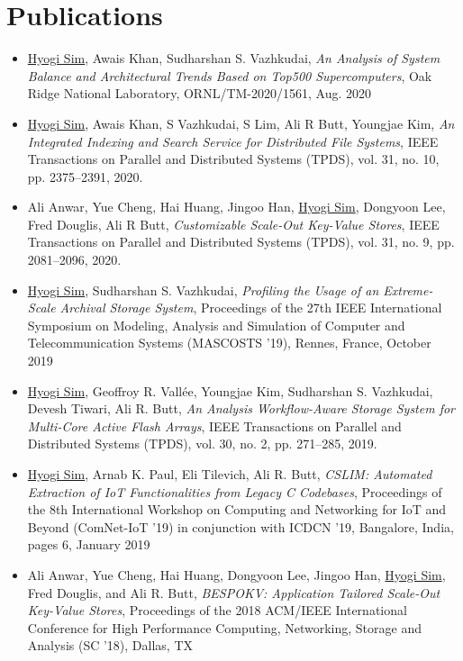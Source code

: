 \section{Publications}
\begin{itemize}
\item \underline{Hyogi Sim}, Awais Khan, Sudharshan S. Vazhkudai,
  {\it An Analysis of System Balance and Architectural Trends Based on Top500 Supercomputers},
  Oak Ridge National Laboratory, ORNL/TM-2020/1561, Aug. 2020
\item \underline{Hyogi Sim}, Awais Khan, S Vazhkudai, S Lim, Ali R Butt, Youngjae Kim,
  {\it An Integrated Indexing and Search Service for Distributed File Systems},
  IEEE Transactions on Parallel and Distributed Systems (TPDS), 
  vol. 31, no. 10, pp. 2375–2391, 2020.
\item Ali Anwar, Yue Cheng, Hai Huang, Jingoo Han, \underline{Hyogi Sim},
      Dongyoon Lee, Fred Douglis, Ali R Butt,
  {\it Customizable Scale-Out Key-Value Stores},
  IEEE Transactions on Parallel and Distributed Systems (TPDS),
  vol. 31, no. 9, pp. 2081–2096, 2020.
\item \underline{Hyogi Sim}, Sudharshan S. Vazhkudai,
  {\it Profiling the Usage of an Extreme-Scale Archival Storage System},
  Proceedings of the 27th IEEE International Symposium on Modeling, Analysis and Simulation of Computer and Telecommunication Systems
  (MASCOSTS '19), Rennes, France, October 2019
\item \underline{Hyogi Sim}, Geoffroy R. Vall\'ee,
	Youngjae Kim, Sudharshan S. Vazhkudai, Devesh Tiwari, Ali R. Butt,
  {\it An Analysis Workflow-Aware Storage System for Multi-Core Active Flash Arrays},
  IEEE Transactions on Parallel and Distributed Systems (TPDS), 
  vol. 30, no. 2, pp. 271–285, 2019.
\item \underline{Hyogi Sim}, Arnab K. Paul, Eli Tilevich, Ali R. Butt,
  {\it CSLIM: Automated Extraction of IoT Functionalities from Legacy C Codebases},
  Proceedings of the 8th International Workshop on Computing and Networking for
  IoT and Beyond (ComNet-IoT ’19) in conjunction with ICDCN '19, Bangalore,
  India, pages 6, January 2019
\item Ali Anwar, Yue Cheng, Hai Huang, Dongyoon Lee, Jingoo Han, \underline{Hyogi Sim},
  Fred Douglis, and Ali R. Butt,
  {\it BESPOKV: Application Tailored Scale-Out Key-Value Stores},
  Proceedings of the 2018 ACM/IEEE International Conference for High
  Performance Computing, Networking, Storage and Analysis (SC '18), Dallas, TX

\end{itemize}
